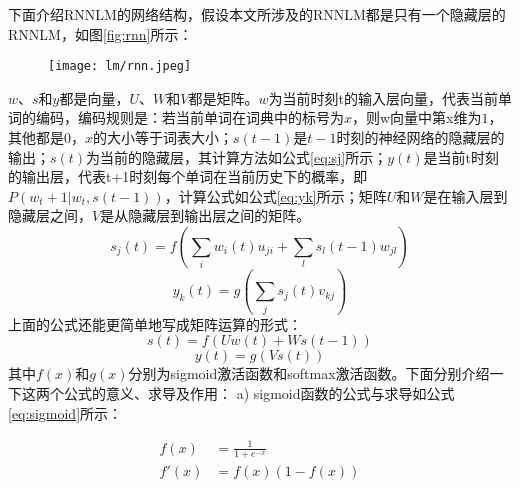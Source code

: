下面介绍RNNLM的网络结构，假设本文所涉及的RNNLM都是只有一个隐藏层的RNNLM，如图\ref{fig:rnn}所示：
\begin{figure}[!htbp]
  \centering
  \begin{minipage}[b]{0.6\textwidth}
    \captionstyle{\centering}
    \centering
    \texttt{[image: lm/rnn.jpeg]}
  \end{minipage}     
\end{figure}
$w$、$s$和$y$都是向量，$U$、$W$和$V$都是矩阵。$w$为当前时刻t的输入层向量，代表当前单词的编码，编码规则是：若当前单词在词典中的标号为$x$，则w向量中第x维为$1$，其他都是$0$，$x$的大小等于词表大小；$s(t-1)$是$t-1$时刻的神经网络的隐藏层的输出；$s(t)$为当前的隐藏层，其计算方法如公式\ref{eq:sj}所示；$y(t)$是当前t时刻的输出层，代表t+1时刻每个单词在当前历史下的概率，即$P({w_t+1}|{w_t}, s(t-1))$，计算公式如公式\ref{eq:yk}所示；矩阵$U$和$W$是在输入层到隐藏层之间，$V$是从隐藏层到输出层之间的矩阵。
\begin{equation}
	\label{eq:sj}
   	{s_j}\left( t \right) = f\left( {\sum\limits_i {{w_i}\left( t \right){u_{ji}} + \sum\limits_l {{s_l}\left( {t - 1} \right)} } {w_{jl}}} \right)
\end{equation}
\begin{equation}
	\label{eq:yk}
   	{y_k}\left( t \right) = g\left( {\sum\limits_j {{s_j}\left( t \right){v_{kj}}} } \right)
\end{equation}
上面的公式还能更简单地写成矩阵运算的形式：
\begin{equation}
\label{eq:st}
   	s\left( t \right) = f\left( {Uw\left( t \right) + Ws\left( {t - 1} \right)} \right)
\end{equation}
\begin{equation}
\label{eq:yt}
   	y\left( t \right) = g\left( {Vs\left( t \right)} \right)
\end{equation}
其中$f(x)$和$g(x)$分别为sigmoid激活函数和softmax激活函数。下面分别介绍一下这两个公式的意义、求导及作用：
a)	sigmoid函数的公式与求导如公式\ref{eq:sigmoid}所示：

\begin{equation}
\begin{split}
	\label{eq:sigmoid}
   		f\left( x \right) &= \frac{1}{{1 + {e^{ - x}}}}\\
		f'\left( x \right) &= f\left( x \right)\left( {1 - f\left( x \right)} \right)
\end{split}
\end{equation}


